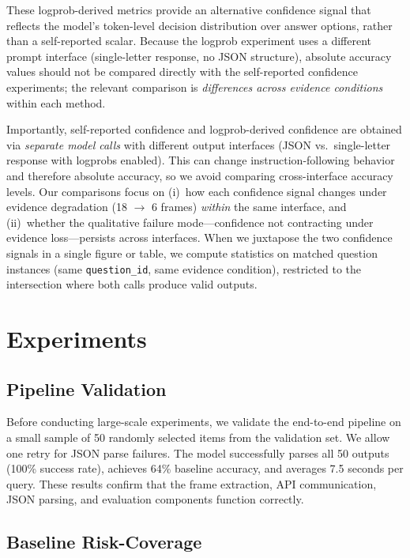 \documentclass{article}
\begin{document}
These logprob-derived metrics provide an alternative confidence signal that reflects the model's token-level decision distribution over answer options, rather than a self-reported scalar. Because the logprob experiment uses a different prompt interface (single-letter response, no JSON structure), absolute accuracy values should not be compared directly with the self-reported confidence experiments; the relevant comparison is \emph{differences across evidence conditions} within each method.

Importantly, self-reported confidence and logprob-derived confidence are obtained via \emph{separate model calls} with different output interfaces (JSON vs.\ single-letter response with logprobs enabled). This can change instruction-following behavior and therefore absolute accuracy, so we avoid comparing cross-interface accuracy levels. Our comparisons focus on (i)~how each confidence signal changes under evidence degradation (18 $\to$ 6 frames) \emph{within} the same interface, and (ii)~whether the qualitative failure mode---confidence not contracting under evidence loss---persists across interfaces. When we juxtapose the two confidence signals in a single figure or table, we compute statistics on matched question instances (same \texttt{question\_id}, same evidence condition), restricted to the intersection where both calls produce valid outputs.

\section{Experiments}

\subsection{Pipeline Validation}

Before conducting large-scale experiments, we validate the end-to-end pipeline on a small sample of 50 randomly selected items from the validation set. We allow one retry for JSON parse failures. The model successfully parses all 50 outputs (100\% success rate), achieves 64\% baseline accuracy, and averages 7.5 seconds per query. These results confirm that the frame extraction, API communication, JSON parsing, and evaluation components function correctly.

\subsection{Baseline Risk-Coverage}
\end{document}
